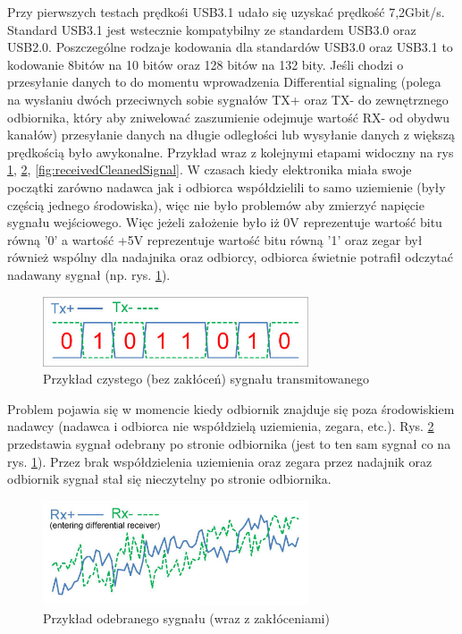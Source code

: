 \documentclass{BscUS}
\begin{document}
\newline
Przy pierwszych testach prędkośi USB3.1 udało się uzyskać prędkość 7,2Gbit/s.
\newline
Standard USB3.1 jest wstecznie kompatybilny ze standardem USB3.0 oraz USB2.0.
\cite{USB30Doc}
\newline
\indent Poszczególne rodzaje kodowania dla standardów USB3.0 oraz USB3.1 to kodowanie 8bitów na 10 bitów oraz 128 bitów na 132 bity. 
Jeśli chodzi o przesyłanie danych to do momentu wprowadzenia Differential signaling (polega na wysłaniu dwóch przeciwnych sobie sygnałów TX+ oraz TX- do zewnętrznego odbiornika, który aby zniwelować zaszumienie odejmuje wartość RX- od obydwu kanałów) przesyłanie danych na długie odległości lub wysyłanie danych z większą prędkością było awykonalne. Przykład wraz z kolejnymi etapami widoczny na rys \ref{fig:cleanSignal}, \ref{fig:receivedNoiseSignal}, \ref{fig:receivedCleanedSignal}.
\newline
\indent W czasach kiedy elektronika miała swoje początki zarówno nadawca jak i odbiorca współdzielili to samo uziemienie (były częścią jednego środowiska), więc nie było problemów aby zmierzyć napięcie sygnału wejściowego. Więc jeżeli założenie było iż 0V reprezentuje wartość bitu równą '0' a wartość +5V reprezentuje wartość bitu równą '1' oraz zegar był również wspólny dla nadajnika oraz odbiorcy, odbiorca świetnie potrafił odczytać nadawany sygnał (np. rys. \ref{fig:cleanSignal}).
\begin{figure}[H]
\centering
\includegraphics[width=0.7\textwidth]{./img/cleanSignal}
\caption{Przykład czystego (bez zakłóceń) sygnału transmitowanego \cite{cleanSignal}}
\label{fig:cleanSignal}
\end{figure}
\noindent Problem pojawia się w momencie kiedy odbiornik znajduje się poza środowiskiem nadawcy (nadawca i odbiorca nie współdzielą uziemienia, zegara, etc.). Rys. \ref{fig:receivedNoiseSignal} przedstawia sygnał odebrany po stronie odbiornika (jest to ten sam sygnał co na rys. \ref{fig:cleanSignal}). Przez brak współdzielenia uziemienia oraz zegara przez nadajnik oraz odbiornik sygnał stał się nieczytelny po stronie odbiornika.
\begin{figure}[H]
\centering
\includegraphics[width=0.7\textwidth]{./img/receivedNoiseSignal}
\caption{Przykład odebranego sygnału (wraz z zakłóceniami) \cite{receivedNoiseSignal}}

\label{fig:receivedNoiseSignal}
\end{figure}
\end{document}
